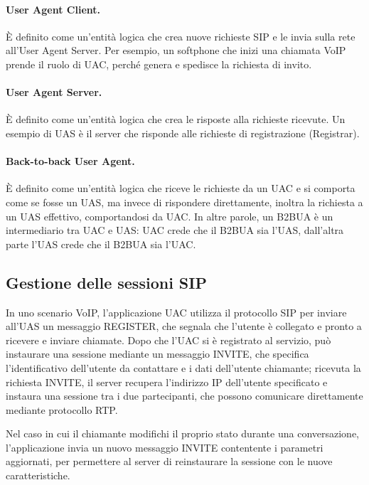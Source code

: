 \documentclass[12pt,a4paper,openright,twoside]{book}
\begin{document}
\paragraph{User Agent Client.}
È definito come un'entità logica che crea nuove richieste SIP e le
invia sulla rete all'User Agent Server. Per esempio, un softphone che
inizi una chiamata VoIP prende il ruolo di UAC, perché genera e
spedisce la richiesta di invito.

\paragraph{User Agent Server.}
È definito come un'entità logica che crea le risposte alla richieste
ricevute. Un esempio di UAS è il server che risponde alle richieste di
registrazione (Registrar).

\paragraph{Back-to-back User Agent.}

È definito come un'entità logica che riceve le richieste da un UAC e
si comporta come se fosse un UAS, ma invece di rispondere
direttamente, inoltra la richiesta a un UAS effettivo, comportandosi
da UAC. In altre parole, un B2BUA è un intermediario tra UAC e UAS:
UAC crede che il B2BUA sia l'UAS, dall'altra parte l'UAS crede che il
B2BUA sia l'UAC.

\subsection{Gestione delle sessioni SIP}

In uno scenario VoIP, l'applicazione UAC utilizza il protocollo SIP
per inviare all'UAS un messaggio REGISTER, che segnala che l'utente è
collegato e pronto a ricevere e inviare chiamate. Dopo che l'UAC si è
registrato al servizio, può instaurare una sessione mediante un
messaggio INVITE, che specifica l'identificativo dell'utente da
contattare e i dati dell'utente chiamante; ricevuta la richiesta
INVITE, il server recupera l'indirizzo IP dell'utente specificato e
instaura una sessione tra i due partecipanti, che possono comunicare
direttamente mediante protocollo RTP.

Nel caso in cui il chiamante modifichi il proprio stato durante una
conversazione, l'applicazione invia un nuovo messaggio INVITE
contentente i parametri aggiornati, per permettere al server di
reinstaurare la sessione con le nuove caratteristiche.
\end{document}
